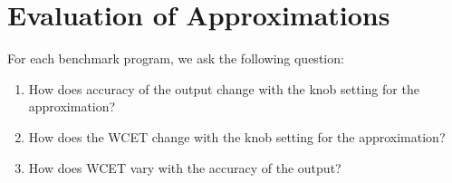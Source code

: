 \section{Evaluation of Approximations}
For each benchmark program, we ask the following question:
\begin{enumerate}
\item How does accuracy of the output change with the knob setting for the approximation?
\item How does the WCET change with the knob setting for the approximation?
\item How does WCET vary with the accuracy of the output?
\end{enumerate}
















